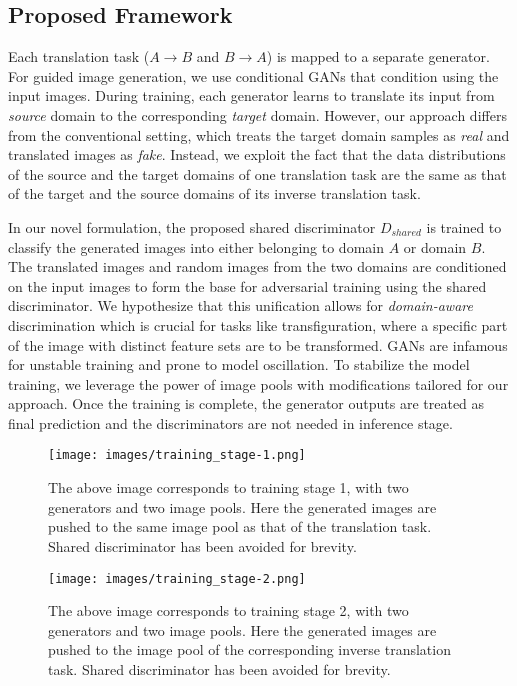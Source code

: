 \documentclass[a4paper,twoside]{article}
\begin{document}
\subsection{Proposed Framework}
\label{Proposed Framework}
\noindent
Each translation task ($A \rightarrow B$ and $B \rightarrow A$) is mapped to a separate generator. For guided image generation, we use conditional GANs \cite{cGAN_MirzaO14} that condition using the input images. During training, each generator learns to translate its input from \textit{source} domain to the corresponding \textit{target} domain. However, our approach differs from the conventional setting, which treats the target domain samples as \textit{real} and translated images as \textit{fake}. Instead, we exploit the fact that the data distributions of the source and the target domains of one translation task are the same as that of the target and the source domains of its inverse translation task.

In our novel formulation, the proposed shared discriminator $D_{shared}$ is trained to classify the generated images into either belonging to domain $A$ or domain $B$. The translated images and random images from the two domains are conditioned on the input images to form the base for adversarial training using the shared discriminator. We hypothesize that this unification allows for \textit{domain-aware} discrimination which is crucial for tasks like transfiguration, where a specific part of the image with distinct feature sets are to be transformed. GANs are infamous for unstable training and prone to model oscillation. To stabilize the model training, we leverage the power of image pools with modifications tailored for our approach. Once the training is complete, the generator outputs are treated as final prediction and the discriminators are not needed in inference stage. 
\begin{figure}[t] \small
\centering
\texttt{[image: images/training\_stage-1.png]}
\caption{The above image corresponds to training stage 1, with two generators and two image pools. Here the generated images are pushed to the same image pool as that of the translation task. Shared discriminator has been avoided for brevity.} 
\label{fig:Training Stage 1}
\centering
\texttt{[image: images/training\_stage-2.png]}
\caption{The above image corresponds to training stage 2, with two generators and two image pools. Here the generated images are pushed to the image pool of the corresponding inverse translation task. Shared discriminator has been avoided for brevity.}
\label{fig:Training Stage 2}
\end{figure}
\end{document}
